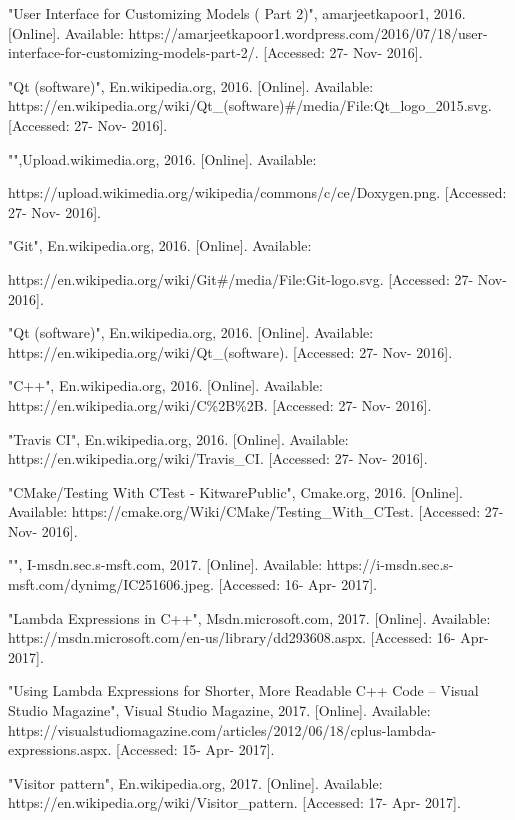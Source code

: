 \begin{thebibliography}{22}
\bibitem{} "User Interface for Customizing Models ( Part 2)", amarjeetkapoor1, 2016. [Online]. Available: https://amarjeetkapoor1.wordpress.com/2016/07/18/user-interface-for-customizing-models-part-2/. [Accessed: 27- Nov- 2016].

\bibitem{} "Qt (software)", En.wikipedia.org, 2016. [Online]. Available: https://en.wikipedia.org/wiki/Qt\_(software)\#/media/File:Qt\_logo\_2015.svg. [Accessed: 27- Nov- 2016].


\bibitem{} "",Upload.wikimedia.org, 2016. [Online]. Available: 

https://upload.wikimedia.org/wikipedia/commons/c/ce/Doxygen.png. [Accessed: 27- Nov- 2016].


\bibitem{} "Git", En.wikipedia.org, 2016. [Online]. Available: 

https://en.wikipedia.org/wiki/Git\#/media/File:Git-logo.svg. [Accessed: 27- Nov- 2016].


\bibitem{}"Qt (software)", En.wikipedia.org, 2016. [Online]. Available: https://en.wikipedia.org/wiki/Qt\_(software). [Accessed: 27- Nov- 2016].

\bibitem{} "C++", En.wikipedia.org, 2016. [Online]. Available: https://en.wikipedia.org/wiki/C\%2B\%2B. [Accessed: 27- Nov- 2016].

\bibitem{}"Travis CI", En.wikipedia.org, 2016. [Online]. Available: https://en.wikipedia.org/wiki/Travis\_CI. [Accessed: 27- Nov- 2016].

\bibitem{} "CMake/Testing With CTest - KitwarePublic", Cmake.org, 2016. [Online]. Available: https://cmake.org/Wiki/CMake/Testing\_With\_CTest. [Accessed: 27- Nov- 2016].

\bibitem{} "", I-msdn.sec.s-msft.com, 2017. [Online]. Available: https://i-msdn.sec.s-msft.com/dynimg/IC251606.jpeg. [Accessed: 16- Apr- 2017].

 \bibitem{} "Lambda Expressions in C++", Msdn.microsoft.com, 2017. [Online]. Available: https://msdn.microsoft.com/en-us/library/dd293608.aspx. [Accessed: 16- Apr- 2017].

 \bibitem{} "Using Lambda Expressions for Shorter, More Readable C++ Code -- Visual Studio Magazine", Visual Studio Magazine, 2017. [Online]. Available: https://visualstudiomagazine.com/articles/2012/06/18/cplus-lambda-expressions.aspx. [Accessed: 15- Apr- 2017].

 \bibitem{} "Visitor pattern", En.wikipedia.org, 2017. [Online]. Available: https://en.wikipedia.org/wiki/Visitor\_pattern. [Accessed: 17- Apr- 2017].


\end{thebibliography}
